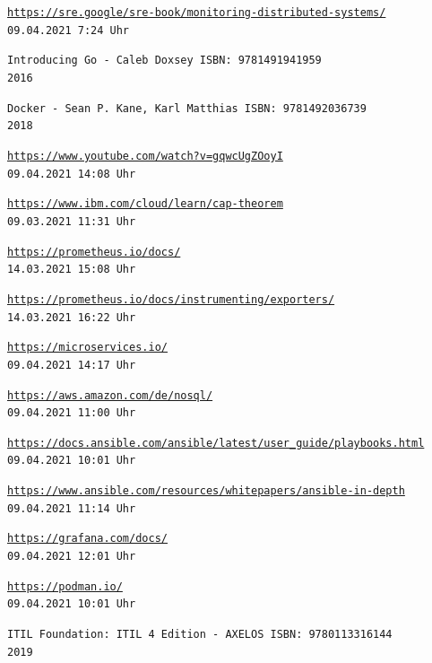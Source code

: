 \documentclass[11pt,a4paper]{article}
\begin{document}
\begin{thebibliography}{9}
  \texttt{\url{https://sre.google/sre-book/monitoring-distributed-systems/}}
  \\\hfill \texttt{09.04.2021 7:24 Uhr}

  \texttt{Introducing Go - Caleb Doxsey ISBN: 9781491941959}
  \\\hfill \texttt{2016}

  \texttt{Docker - Sean P. Kane, Karl Matthias ISBN: 9781492036739}
  \\\hfill \texttt{2018}

  \texttt{\url{https://www.youtube.com/watch?v=gqwcUgZOoyI}}
  \\\hfill \texttt{09.04.2021 14:08 Uhr}

  \texttt{\url{https://www.ibm.com/cloud/learn/cap-theorem}}
  \\\hfill \texttt{09.03.2021 11:31 Uhr}

  \texttt{\url{https://prometheus.io/docs/}}
  \\\hfill \texttt{14.03.2021 15:08 Uhr}

  \texttt{\url{https://prometheus.io/docs/instrumenting/exporters/}}
  \\\hfill \texttt{14.03.2021 16:22 Uhr}

  \texttt{\url{https://microservices.io/}}
  \\\hfill \texttt{09.04.2021 14:17 Uhr}

  \texttt{\url{https://aws.amazon.com/de/nosql/}}
  \\\hfill \texttt{09.04.2021 11:00 Uhr}

  \texttt{\url{https://docs.ansible.com/ansible/latest/user_guide/playbooks.html}}
  \\\hfill \texttt{09.04.2021 10:01 Uhr}

  \texttt{\url{https://www.ansible.com/resources/whitepapers/ansible-in-depth}}
  \\\hfill \texttt{09.04.2021 11:14 Uhr}

  \texttt{\url{https://grafana.com/docs/}}
  \\\hfill \texttt{09.04.2021 12:01 Uhr}

  \texttt{\url{https://podman.io/}}
  \\\hfill \texttt{09.04.2021 10:01 Uhr}

  \texttt{ITIL Foundation: ITIL 4 Edition - AXELOS ISBN: 9780113316144 }
  \\\hfill \texttt{2019}

\end{thebibliography}
\end{document}
